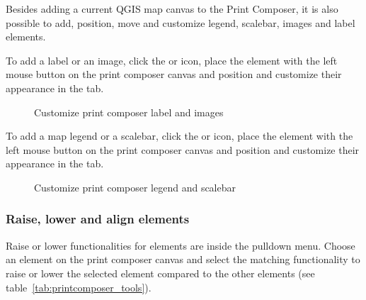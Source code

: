 Besides adding a current QGIS map canvas to the Print Composer, it is also possible 
to add, position, move and customize legend, scalebar, images and label elements.


To add a label or an image, click the  or 
 icon, place the element with
the left mouse button on the print composer canvas and position and customize
their appearance in the  tab. 

\begin{figure}[ht]
\centering
\caption{Customize print composer label and images \nixcaption}\label{fig:print_composer_tab2}
   \goodgap
\end{figure}


To add a map legend or a scalebar, click the  or 
 icon, place the element with the left 
mouse button on the print composer canvas and position and customize their appearance in the  tab.

\begin{figure}[ht]
\centering
\caption{Customize print composer legend and scalebar \nixcaption}\label{fig:print_composer_tab1}
   \goodgap
\end{figure}

\subsubsection{Raise, lower and align elements}

Raise or lower functionalities for elements are inside the
 pulldown menu. Choose an
element on the print composer canvas and select the matching functionality to
raise or lower the selected element compared to the other elements (see
table~\ref{tab:printcomposer_tools}). 

